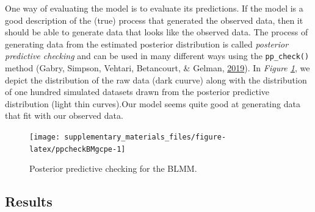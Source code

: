 \documentclass[
  11pt,
  english,
  ,doc,floatsintext]{apa6}
\begin{document}
One way of evaluating the model is to evaluate its predictions. If the model is a good description of the (true) process that generated the observed data, then it should be able to generate data that looks like the observed data. The process of generating data from the estimated posterior distribution is called \emph{posterior predictive checking} and can be used in many different ways using the \texttt{pp\_check()} method (Gabry, Simpson, Vehtari, Betancourt, \& Gelman, \protect\hyperlink{ref-gabry_visualization_2019}{2019}). In \emph{Figure \ref{fig:ppcheckBMgcpe}}, we depict the distribution of the raw data (dark cuurve) along with the distribution of one hundred simulated datasets drawn from the posterior predictive distribution (light thin curves).Our model seems quite good at generating data that fit with our observed data.

\begin{figure}[htb]

{\centering \texttt{[image: supplementary\_materials\_files/figure-latex/ppcheckBMgcpe-1]} 

}

\caption{Posterior predictive checking for the BLMM.}\label{fig:ppcheckBMgcpe}
\end{figure}

\newpage

\hypertarget{results}{%
\subsection{Results}\label{results}}
\end{document}
